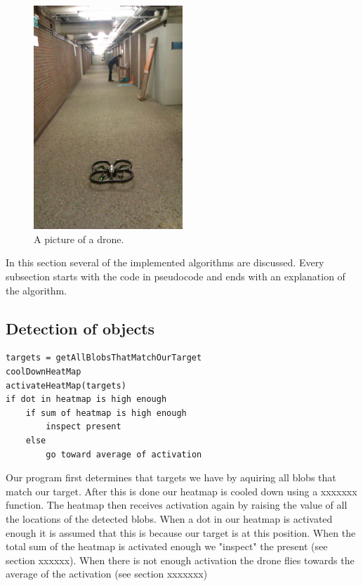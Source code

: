 \documentclass[a4paper,10pt]{article}
\begin{document}
\begin{figure}[h!]
	\caption{A picture of a drone.}
	\centering
	\includegraphics[width=0.5\textwidth]{images/boringHallway}
\end{figure}

In this section several of the implemented algorithms are discussed. Every subsection starts with the code in pseudocode and ends with an explanation of the algorithm. 
\subsection{Detection of objects}
\begin{verbatim}
targets = getAllBlobsThatMatchOurTarget
coolDownHeatMap
activateHeatMap(targets)
if dot in heatmap is high enough
	if sum of heatmap is high enough
		inspect present
	else
		go toward average of activation

\end{verbatim}
Our program first determines that targets we have by aquiring all blobs that match our target.
After this is done our heatmap is cooled down using a xxxxxxx function. 
The heatmap then receives activation again by raising the value of all the locations of the detected blobs. 
When a dot in our heatmap is activated enough it is assumed that this is because our target is at this position. 
When the total sum of the heatmap is activated enough we "inspect" the present (see section xxxxxx). 
When there is not enough activation the drone flies towards the average of the activation (see section xxxxxxx)
\end{document}
